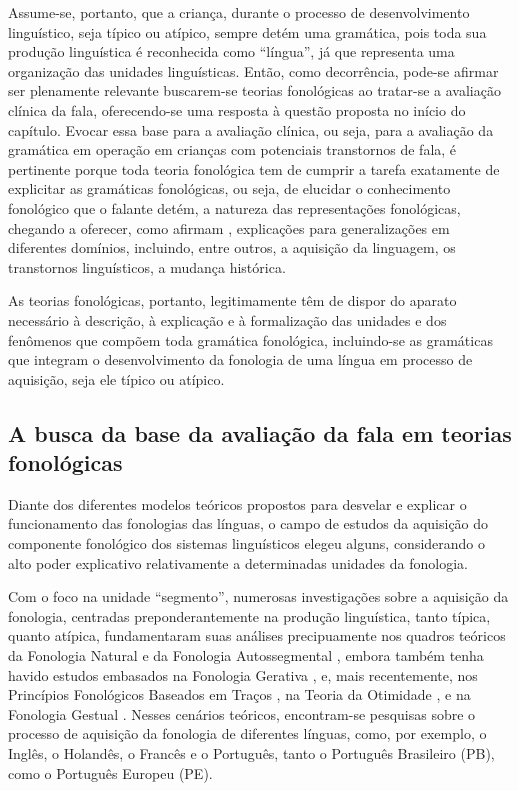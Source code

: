 \documentclass[output=paper,colorlinks,citecolor=brown,booklanguage=portuguese]{langscibook}
\begin{document}
Assume-se, portanto, que a criança, durante o processo de desenvolvimento linguístico, seja típico ou atípico, sempre detém uma gramática, pois toda sua produção linguística é reconhecida como “língua”, já que representa uma organização das unidades linguísticas. Então, como decorrência, pode-se afirmar ser plenamente relevante buscarem-se teorias fonológicas ao tratar-se a avaliação clínica da fala, oferecendo-se uma resposta à questão proposta no início do capítulo. Evocar essa base para a avaliação clínica, ou seja, para a avaliação da gramática em operação em crianças com potenciais transtornos de fala, é pertinente porque toda teoria fonológica tem de cumprir a tarefa exatamente de explicitar as gramáticas fonológicas, ou seja, de elucidar o conhecimento fonológico que o falante detém, a natureza das representações fonológicas, chegando a oferecer, como afirmam \citet[245]{Clements1995}, explicações para generalizações em diferentes domínios, incluindo, entre outros, a aquisição da linguagem, os transtornos linguísticos, a mudança histórica. 

As teorias fonológicas, portanto, legitimamente têm de dispor do aparato necessário à descrição, à explicação e à formalização das unidades e dos fenômenos que compõem toda gramática fonológica, incluindo-se as gramáticas que integram o desenvolvimento da fonologia de uma língua em processo de aquisição, seja ele típico ou atípico.  

\subsection{A busca da base da avaliação da fala em teorias fonológicas}



Diante dos diferentes modelos teóricos propostos para desvelar e explicar o funcionamento das fonologias das línguas, o campo de estudos da aquisição do componente fonológico dos sistemas linguísticos elegeu alguns, considerando o alto poder explicativo relativamente a determinadas unidades da fonologia.

Com o foco na unidade “segmento”, numerosas investigações sobre a aquisição da fonologia, centradas preponderantemente na produção linguística, tanto típica, quanto atípica, fundamentaram suas análises precipuamente nos quadros teóricos da Fonologia Natural \citep{Stampe1973} e da Fonologia Autossegmental \citep{Clements1985, Clements1991, Clements1995} , embora também tenha havido estudos embasados na Fonologia Gerativa \citep{Chomsky1968}, e, mais recentemente, nos Princípios Fonológicos Baseados em Traços \citep{Clements2009}, na Teoria da Otimidade \citep{Prince1993, Boersma2011, Boersma2009}, e na Fonologia Gestual \citep{Browman1989, Browman1992, Albano2009}. Nesses cenários teóricos, encontram-se pesquisas sobre o processo de aquisição da fonologia de diferentes línguas, como, por exemplo, o Inglês, o Holandês, o Francês e o Português, tanto o Português Brasileiro (PB), como o Português Europeu (PE).
\end{document}

